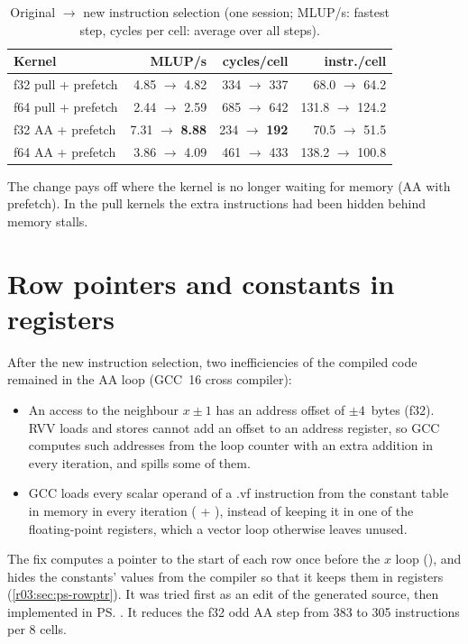 \begin{table}[htbp]
  \centering\small
  \caption{Original $\rightarrow$ new instruction selection (one session; MLUP/s: fastest step,
    cycles per cell: average over all steps).}\label{r03:tab:selector}
  \begin{tabular}{@{}lrrr@{}}
    \toprule
    \textbf{Kernel} & \textbf{MLUP/s} & \textbf{cycles/cell} & \textbf{instr./cell}\\
    \midrule
    f32 pull + prefetch & 4.85 $\rightarrow$ 4.82 & 334 $\rightarrow$ 337 & 68.0 $\rightarrow$ 64.2\\
    f64 pull + prefetch & 2.44 $\rightarrow$ 2.59 & 685 $\rightarrow$ 642 & 131.8 $\rightarrow$ 124.2\\
    f32 AA + prefetch & 7.31 $\rightarrow$ \textbf{8.88} & 234 $\rightarrow$ \textbf{192} & 70.5 $\rightarrow$ 51.5\\
    f64 AA + prefetch & 3.86 $\rightarrow$ 4.09 & 461 $\rightarrow$ 433 & 138.2 $\rightarrow$ 100.8\\
    \bottomrule
  \end{tabular}
\end{table}

The change pays off where the kernel is no longer waiting for memory (AA with prefetch). In the
pull kernels the extra instructions had been hidden behind memory stalls.

\section{Row pointers and constants in registers}\label{r03:sec:lever-rp}

After the new instruction selection, two inefficiencies of the compiled code remained in the
AA loop (GCC~16 cross compiler):
\begin{itemize}
  \item An access to the neighbour $x \pm 1$ has an address offset of $\pm 4$~bytes (f32). RVV
        loads and stores cannot add an offset to an address register, so GCC computes such
        addresses from the loop counter with an extra addition in every iteration, and spills
        some of them.
  \item GCC loads every scalar operand of a .vf instruction from the constant table in memory
        in every iteration ( + ), instead of keeping it in one of the
        floating-point registers, which a vector loop otherwise leaves unused.
\end{itemize}
The fix computes a pointer to the start of each row once before the $x$ loop (), and hides the constants' values from the compiler so that it keeps them in
registers (\cref{r03:sec:ps-rowptr}). It was tried first as an edit of the generated source,
then implemented in \ps{}. It reduces the f32 odd AA step from 383 to 305 instructions per 8
cells.

